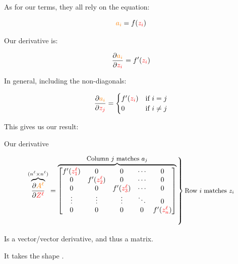         As for our  terms, they all rely on the equation:
        
        \begin{equation}
            \textcolor{orange}{a_i} = f(\textcolor{red}{z_i})
        \end{equation}
        
        Our derivative is:
        
        \begin{equation}
            \frac{\partial  \textcolor{orange}{a_i} }{\partial  \textcolor{red}{z_i} }  = f'(\textcolor{red}{z_i})
        \end{equation}
        
        In general, including the non-diagonals:
        
        \begin{equation}
            \frac{\partial  \textcolor{orange}{a_i} }{\partial  \textcolor{red}{z_j} }
            = 
            \begin{cases}
              f'(\textcolor{red}{z_i}) & \text{if } i = j\\
              0 & \text{if } i \neq j
            \end{cases}
        \end{equation}
        
        This gives us our result:\\

        \begin{notation}
            Our derivative
            
            \begin{equation*}
                \overbrace{
                    \pderiv {\org{A^\ell}}   {\red{Z^\ell}}
                }^{ (n^{\ell} \times n^{\ell}) }
                =
                \overbrace{
                    \begin{bmatrix}
                        f'({\red{z_1^\ell}})&0                   &0                   &\cdots  & 0 \\
                        0                   &f'({\red{z_2^\ell}})&0                   &\cdots  & 0 \\
                        0                   &0                   &f'({\red{z_3^\ell}})&\cdots  & 0 \\
                        \vdots              &\vdots              &\vdots              &\ddots  & 0 \\
                        0                   &0                   &0                   &0   &f'({\red{z_n^\ell}})
                    \end{bmatrix}
                }^{ \text{\small Column $j$ matches $a_j$} }
                \bigggrB{100pt} \text{\small Row $i$ matches $z_i$} 
            \end{equation*}
        
            Is a vector/vector derivative, and thus a matrix.
            
            It takes the shape .
        \end{notation}
    
